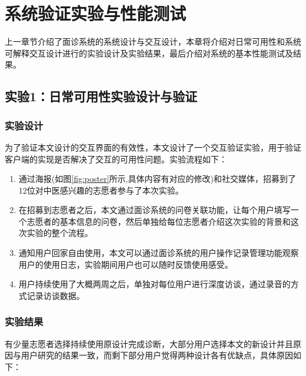\chapter{系统验证实验与性能测试}

上一章节介绍了面诊系统的系统设计与交互设计，本章将介绍对日常可用性和系统可解释交互设计进行的实验设计及实验结果，最后介绍对系统的基本性能测试及结果。

\section{实验1：日常可用性实验设计与验证}

\subsection{实验设计}
为了验证本文设计的交互界面的有效性，本文设计了一个交互验证实验，用于验证客户端的实现是否解决了交互的可用性问题。实验流程如下：
\begin{enumerate}


    \item 通过海报(如图\ref{fig:poster}所示,具体内容有对应的修改)和社交媒体，招募到了12位对中医感兴趣的志愿者参与了本次实验。

    \item 在招募到志愿者之后，本文通过面诊系统的问卷关联功能，让每个用户填写一个志愿者的基本信息的问卷，然后单独给每位志愿者介绍这次实验的背景和这次实验的整个流程。

    \item 通知用户回家自由使用，本文可以通过面诊系统的用户操作记录管理功能观察用户的使用日志，实验期间用户也可以随时反馈使用感受。

    \item 用户持续使用了大概两周之后，单独对每位用户进行深度访谈，通过录音的方式记录访谈数据。

\end{enumerate}

\subsection{实验结果}



有少量志愿者选择持续使用原设计完成诊断，大部分用户选择本文的新设计并且原因与用户研究的结果一致，而剩下部分用户觉得两种设计各有优缺点，具体原因如下：


